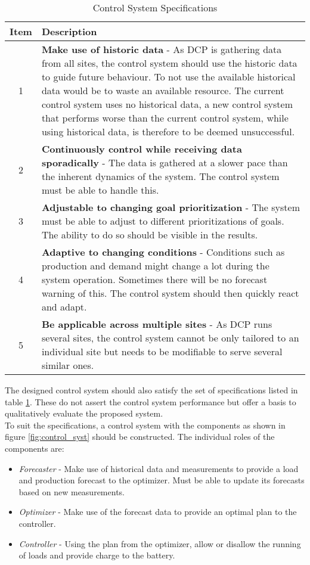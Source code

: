 \begin{table}[h]
    \centering
    \begin{tabular}{|c|p{12cm}|}
        \hline
        \textbf{Item} & \textbf{Description} \\
        \hline
        1 & \textbf{Make use of historic data} - As DCP is gathering data from all sites, the control system should use the historic data to guide future behaviour. To not use the available historical data would be to waste an available resource.  The current control system uses no historical data, a new control system that performs worse than the current control system, while using historical data, is therefore to be deemed unsuccessful. \\
        \hline
        2 & \textbf{Continuously control while receiving data sporadically} - The data is gathered at a slower pace than the inherent dynamics of the system. The control system must be able to handle this. \\
        \hline
        3 & \textbf{Adjustable to changing goal prioritization} - The system must be able to adjust to different prioritizations of goals. The ability to do so should be visible in the results. \\
        \hline
        4 & \textbf{Adaptive to changing conditions} - Conditions such as production and demand might change a lot during the system operation. Sometimes there will be no forecast warning of this. The control system should then quickly react and adapt. \\
        \hline
        5 & \textbf{Be applicable across multiple sites} - As DCP runs several sites, the control system cannot be only tailored to an individual site but needs to be modifiable to serve several similar ones. \\
        \hline
    \end{tabular}
    \caption{Control System Specifications}
    \label{tab:control_system_specification}
\end{table}

The designed control system should also satisfy the set of specifications listed in table \ref{tab:control_system_specification}. These do not assert the control system performance but offer a basis to qualitatively evaluate the proposed system.\\

To suit the specifications, a control system with the components as shown in figure \ref{fig:control_syst} should be constructed. The individual roles of the components are:
\begin{itemize}
    \item \textit{Forecaster}   -   Make use of historical data and measurements to provide a load and production forecast to the optimizer. Must be able to update its forecasts based on new measurements.
    \item \textit{Optimizer}    -   Make use of the forecast data to provide an optimal plan to the controller.
    \item \textit{Controller}   -   Using the plan from the optimizer, allow or disallow the running of loads and provide charge to the battery.
\end{itemize}


